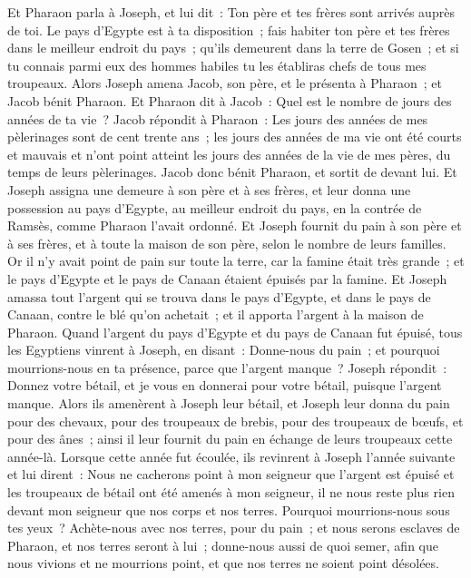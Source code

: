 \begin{multicols}{2}
Et Pharaon parla à Joseph, et lui dit~: Ton père et tes frères sont arrivés auprès de toi.
Le pays d'Egypte est à ta disposition~; fais habiter ton père et tes frères dans le meilleur endroit du pays~; qu'ils demeurent dans la terre de Gosen~; et si tu connais parmi eux des hommes habiles tu les établiras chefs de tous mes troupeaux.
Alors Joseph amena Jacob, son père, et le présenta à Pharaon~; et Jacob bénit Pharaon.
Et Pharaon dit à Jacob~: Quel est le nombre de jours des années de ta vie~?
Jacob répondit à Pharaon~: Les jours des années de mes pèlerinages sont de cent trente ans~; les jours des années de ma vie ont été courts et mauvais et n'ont point atteint les jours des années de la vie de mes pères, du temps de leurs pèlerinages.
Jacob donc bénit Pharaon, et sortit de devant lui.
Et Joseph assigna une demeure à son père et à ses frères, et leur donna une possession au pays d'Egypte, au meilleur endroit du pays, en la contrée de Ramsès, comme Pharaon l'avait ordonné.
Et Joseph fournit du pain à son père et à ses frères, et à toute la maison de son père, selon le nombre de leurs familles.
Or il n'y avait point de pain sur toute la terre, car la famine était très grande~; et le pays d'Egypte et le pays de Canaan étaient épuisés par la famine.
Et Joseph amassa tout l'argent qui se trouva dans le pays d'Egypte, et dans le pays de Canaan, contre le blé qu'on achetait~; et il apporta l'argent à la maison de Pharaon.
Quand l'argent du pays d'Egypte et du pays de Canaan fut épuisé, tous les Egyptiens vinrent à Joseph, en disant~: Donne-nous du pain~; et pourquoi mourrions-nous en ta présence, parce que l'argent manque~?
Joseph répondit~: Donnez votre bétail, et je vous en donnerai pour votre bétail, puisque l'argent manque.
Alors ils amenèrent à Joseph leur bétail, et Joseph leur donna du pain pour des chevaux, pour des troupeaux de brebis, pour des troupeaux de bœufs, et pour des ânes~; ainsi il leur fournit du pain en échange de leurs troupeaux cette année-là.
Lorsque cette année fut écoulée, ils revinrent à Joseph l'année suivante et lui dirent~: Nous ne cacherons point à mon seigneur que l'argent est épuisé et les troupeaux de bétail ont été amenés à mon seigneur, il ne nous reste plus rien devant mon seigneur que nos corps et nos terres.
Pourquoi mourrions-nous sous tes yeux~? Achète-nous avec nos terres, pour du pain~; et nous serons esclaves de Pharaon, et nos terres seront à lui~; donne-nous aussi de quoi semer, afin que nous vivions et ne mourrions point, et que nos terres ne soient point désolées.

\end{multicols}

